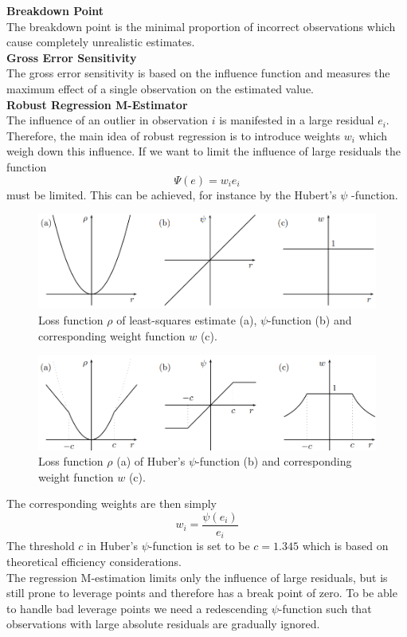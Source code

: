 \textbf{Breakdown Point}\\
The breakdown point is the minimal proportion of incorrect observations which cause completely unrealistic estimates.\\
\textbf{Gross Error Sensitivity}\\
The gross error sensitivity is based on the influence function and measures the maximum effect of a single observation on the estimated value.\\
\textbf{Robust Regression M-Estimator}\\
The influence of an outlier in observation $i$ is manifested in a large residual $e_i$. Therefore, the main idea of robust regression is to introduce weights $w_i$ which weigh down this influence. If we want to limit the influence of large residuals the function
\begin{equation}
  \Psi(e) = w_i e_i
\end{equation}
must be limited. This can be achieved, for instance by the Hubert's $\psi$ -function.
\begin{figure}[H]
  \centering
  \includegraphics[width=\linewidth]{Pics/10.4.1.png}
  \caption{Loss function $\rho$ of least-squares estimate (a), $\psi$-function (b) and corresponding weight function $w$ (c).}
\end{figure}
\begin{figure}[H]
  \centering
  \includegraphics[width=\linewidth]{Pics/10.4.2.png}
  \caption{Loss function $\rho$ (a) of Huber’s $\psi$-function (b) and corresponding weight function $w$ (c).}
\end{figure}
The corresponding weights are then simply
\begin{equation}
  w_i = \frac{\psi (e_i)}{e_i}
\end{equation}
The threshold $c$ in Huber’s $\psi$-function is set to be $c = 1.345$ which is based on theoretical efficiency considerations.\\
The regression M-estimation limits only the influence of large residuals, but is still prone to leverage points and therefore has a break point of zero. To be able to handle bad leverage points we need a redescending $\psi$-function such that observations with large absolute residuals are gradually ignored.\\

